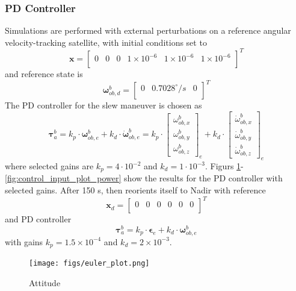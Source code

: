 \subsubsection{PD Controller}
Simulations are performed with external perturbations on a reference angular velocity-tracking satellite, with initial conditions set to
\begin{equation}
   \mathbf{x} = 
	\begin{bmatrix}
   0 & 0 & 0 & 1\times10^{-6} & 1\times10^{-6} & 1\times10^{-6} \\
   \end{bmatrix}^{T}
\end{equation}
and reference state is
\begin{equation}
   \boldsymbol{\omega}^{b}_{ob,d} = 
	\begin{bmatrix}
   0 & 0.7028^{\circ}/s & 0 \\
   \end{bmatrix}^{T}
\end{equation}
The PD controller for the slew maneuver is chosen as
\begin{equation}
    \boldsymbol{\tau}_a^b =  k_p \cdot \boldsymbol{\omega}^{b}_{ob,e} + k_d \cdot \dot{\boldsymbol{\omega}}^{b}_{ob,e} 
		= k_p \cdot \begin{bmatrix}
    \omega^{b}_{ob,x} \\
   \omega^{b}_{ob,y} \\
   \omega^{b}_{ob,z}
   \end{bmatrix}_{e} + k_d \cdot \begin{bmatrix}
    \dot{\omega}^{b}_{ob,x} \\
   \dot{\omega}^{b}_{ob,y} \\
   \dot{\omega}^{b}_{ob,z}
   \end{bmatrix}_{e}
\end{equation}
where selected gains are $k_p=4\cdot10^{-2}$ and $k_d=1\cdot10^{-3}$. 
Figurs \ref{fig:euler_plot}-\ref{fig:control_input_plot_power} show the results for the PD controller with selected gains. After 150 s, then \hypso reorients itself to Nadir with reference
\begin{equation}
   \mathbf{x}_d = 
	\begin{bmatrix}
   0 & 0 & 0 & 0 & 0 & 0 \\
   \end{bmatrix}^{T}
\end{equation}
\noindent and PD controller
\begin{equation}
    \boldsymbol{\tau}_a^b =  k_p \cdot \boldsymbol{\epsilon}_{e} + k_d \cdot \boldsymbol{\omega}^{b}_{ob,e} 
\end{equation}
\noindent with gains $k_p=1.5\times10^{-4}$ and $k_d=2\times10^{-3}$.
    \begin{figure}[htbp]
        \centering
        \texttt{[image: figs/euler\_plot.png]}
				\caption{Attitude}
				\label{fig:euler_plot}
    \end{figure}%
	

